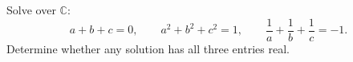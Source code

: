 Solve over $\mathbb C$:
\[a+b+c=0,\qquad a^2+b^2+c^2=1,\qquad \dfrac{1}{a}+\dfrac{1}{b}+\dfrac{1}{c}=-1.\]
Determine whether any solution has all three entries real.
